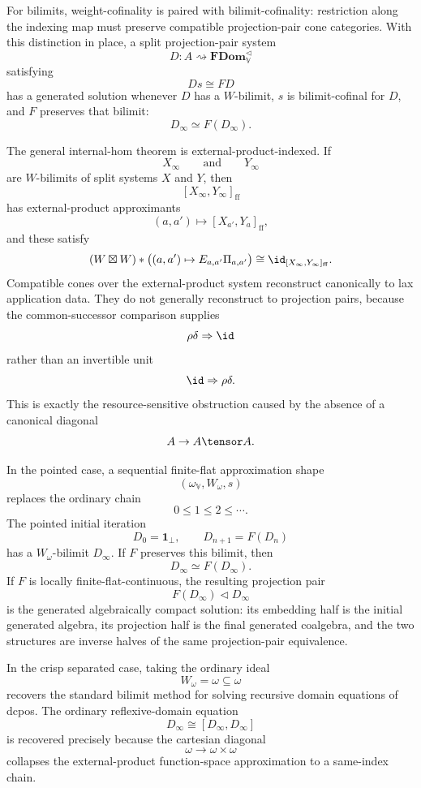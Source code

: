 For bilimits, weight-cofinality is paired with bilimit-cofinality: restriction
along the indexing map must preserve compatible projection-pair cone
categories.  With this distinction in place, a split projection-pair system
\[
    D:A\rightsquigarrow\mathbf{FDom}_{\mathbb V}^{\triangleleft}
\]
satisfying
\[
    Ds\cong FD
\]
has a generated solution whenever \(D\) has a \(W\)-bilimit, \(s\) is
bilimit-cofinal for \(D\), and \(F\) preserves that bilimit:
\[
    D_\infty\simeq F(D_\infty).
\]

The general internal-hom theorem is external-product-indexed.  If
\[
    X_\infty
    \qquad\text{and}\qquad
    Y_\infty
\]
are \(W\)-bilimits of split systems \(X\) and \(Y\), then
\[
    [X_\infty,Y_\infty]_{\mathrm{ff}}
\]
has external-product approximants
\[
    (a,a')\longmapsto [X_{a'},Y_a]_{\mathrm{ff}},
\]
and these satisfy
\[
    (W\boxtimes W)*
    \bigl((a,a')\mapsto E_{a,a'}\Pi_{a,a'}\bigr)
    \cong
    \id_{[X_\infty,Y_\infty]_{\mathrm{ff}}}.
\]
Compatible cones over the external-product system reconstruct canonically to
lax application data.  They do not generally reconstruct to projection pairs,
because the common-successor comparison supplies
\[
    \rho\delta\Rightarrow\id
\]
rather than an invertible unit
\[
    \id\Rightarrow\rho\delta.
\]
This is exactly the resource-sensitive obstruction caused by the absence of a
canonical diagonal
\[
    A\to A\tensor A.
\]

In the pointed case, a sequential finite-flat approximation shape
\[
    (\omega_{\mathbb V},W_\omega,s)
\]
replaces the ordinary chain
\[
    0\leq1\leq2\leq\cdots.
\]
The pointed initial iteration
\[
    D_0=\mathbf 1_\bot,
    \qquad
    D_{n+1}=F(D_n)
\]
has a \(W_\omega\)-bilimit \(D_\infty\).  If \(F\) preserves this bilimit, then
\[
    D_\infty\simeq F(D_\infty).
\]
If \(F\) is locally finite-flat-continuous, the resulting projection pair
\[
    F(D_\infty)\triangleleft D_\infty
\]
is the generated algebraically compact solution: its embedding half is the
initial generated algebra, its projection half is the final generated
coalgebra, and the two structures are inverse halves of the same projection-pair
equivalence.

In the crisp separated case, taking the ordinary ideal
\[
    W_\omega=\omega\subseteq\omega
\]
recovers the standard bilimit method for solving recursive domain equations of
dcpos.  The ordinary reflexive-domain equation
\[
    D_\infty\cong [D_\infty,D_\infty]
\]
is recovered precisely because the cartesian diagonal
\[
    \omega\to\omega\times\omega
\]
collapses the external-product function-space approximation to a same-index
chain.
